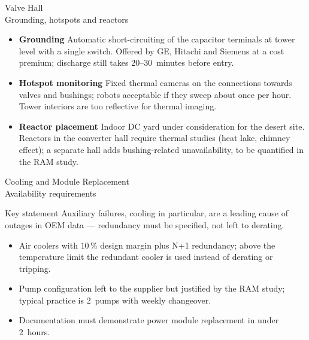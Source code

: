 \begin{frame}{Valve Hall\\Grounding, hotspots and reactors}
  \begin{itemize}
    \setlength{\itemsep}{0.4em}
    \item \textbf{Grounding} Automatic short-circuiting of the capacitor terminals at tower level with a single switch. Offered by GE, Hitachi and Siemens at a cost premium; discharge still takes 20--30~minutes before entry.
    \item \textbf{Hotspot monitoring} Fixed thermal cameras on the connections towards valves and bushings; robots acceptable if they sweep about once per hour. Tower interiors are too reflective for thermal imaging.
    \item \textbf{Reactor placement} Indoor DC yard under consideration for the desert site. Reactors in the converter hall require thermal studies (heat lake, chimney effect); a separate hall adds bushing-related unavailability, to be quantified in the RAM study.
  \end{itemize}
\end{frame}


\begin{frame}{Cooling and Module Replacement\\Availability requirements}
  \begin{block}{Key statement}
    Auxiliary failures, cooling in particular, are a leading cause of outages in OEM data --- redundancy must be specified, not left to derating.
  \end{block}
  \vspace{0.3em}
  \begin{itemize}
    \setlength{\itemsep}{0.4em}
    \item Air coolers with $10\,\%$ design margin plus N+1 redundancy; above the temperature limit the redundant cooler is used instead of derating or tripping.
    \item Pump configuration left to the supplier but justified by the RAM study; typical practice is 2~pumps with weekly changeover.
    \item Documentation must demonstrate power module replacement in under 2~hours.
  \end{itemize}
\end{frame}


